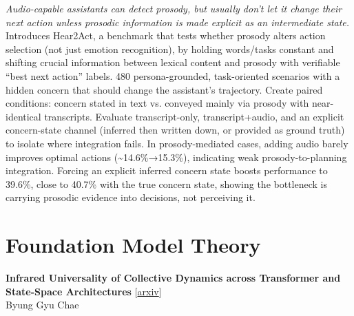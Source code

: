 \documentclass[12pt,letterpaper]{article}
\begin{document}
{\small\textit{Audio-capable assistants can detect prosody, but usually don't let it change their next action unless prosodic information is made explicit as an intermediate state.}}\\[1pt]
{\footnotesize Introduces Hear2Act, a benchmark that tests whether prosody alters action selection (not just emotion recognition), by holding words/tasks constant and shifting crucial information between lexical content and prosody with verifiable ``best next action'' labels. 480 persona-grounded, task-oriented scenarios with a hidden concern that should change the assistant's trajectory. Create paired conditions: concern stated in text vs. conveyed mainly via prosody with near-identical transcripts. Evaluate transcript-only, transcript+audio, and an explicit concern-state channel (inferred then written down, or provided as ground truth) to isolate where integration fails. In prosody-mediated cases, adding audio barely improves optimal actions (\textasciitilde{}14.6\%→15.3\%), indicating weak prosody-to-planning integration. Forcing an explicit inferred concern state boosts performance to 39.6\%, close to 40.7\% with the true concern state, showing the bottleneck is carrying prosodic evidence into decisions, not perceiving it.}

\medskip


\section*{Foundation Model Theory}

{\small\textbf{Infrared Universality of Collective Dynamics across Transformer and State-Space Architectures}} {\scriptsize[\href{https://arxiv.org/abs/2608.18592}{arxiv}]}\\
{\scriptsize Byung Gyu Chae}\\
\end{document}
